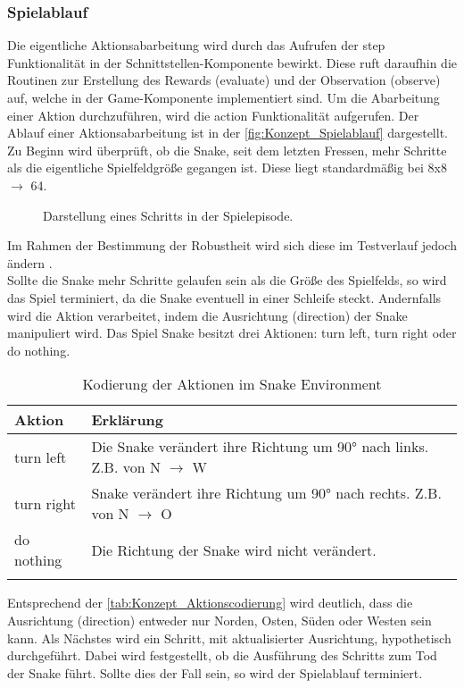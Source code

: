 \subsubsection{Spielablauf} \label{subsubsec:Konzept_Spielablauf}
Die eigentliche Aktionsabarbeitung wird durch das Aufrufen der step Funktionalität in der Schnittstellen-Komponente  bewirkt. Diese ruft daraufhin die Routinen zur Erstellung des Rewards (evaluate) und der Observation (observe) auf, welche in der Game-Komponente implementiert sind.
Um die Abarbeitung einer Aktion durchzuführen, wird die action Funktionalität aufgerufen. Der Ablauf einer Aktionsabarbeitung ist in der \autoref{fig:Konzept_Spielablauf} dargestellt. Zu Beginn wird überprüft, ob die Snake, seit dem letzten Fressen, mehr Schritte als die eigentliche Spielfeldgröße gegangen ist. Diese liegt standardmäßig bei 8x8 $\longrightarrow$ 64.
\begin{figure}[H]
	\centering
	
	\caption[Spielablauf]{Darstellung eines Schritts in der Spielepisode.}
	\label{fig:Konzept_Spielablauf}
\end{figure}
Im Rahmen der Bestimmung der Robustheit wird sich diese im Testverlauf jedoch ändern .\\
Sollte die Snake mehr Schritte gelaufen sein als die Größe des Spielfelds, so wird das Spiel terminiert, da die Snake eventuell in einer Schleife steckt.
Andernfalls wird die Aktion verarbeitet, indem die Ausrichtung (direction) der Snake manipuliert wird. Das Spiel Snake besitzt drei Aktionen: turn left, turn right oder do nothing.
\begin{longtable}[h]{|p{3cm}|p{\linewidth - 4cm}|}
	\hline
	Aktion & Erklärung \\
	\hline
	turn left & Die Snake verändert ihre Richtung um 90° nach links. Z.B. von N $\longrightarrow$ W \\
	\hline
	turn right & Snake verändert ihre Richtung um 90° nach rechts. Z.B. von N $\longrightarrow$ O \\
	\hline
	do nothing & Die Richtung der Snake wird nicht verändert. \\
	\hline
	\caption{Kodierung der Aktionen im Snake Environment}
	\label{tab:Konzept_Aktionscodierung} 
\end{longtable}
Entsprechend der \autoref{tab:Konzept_Aktionscodierung} wird deutlich, dass die Ausrichtung (direction) entweder nur Norden, Osten, Süden oder Westen sein kann.
Als Nächstes wird ein Schritt, mit aktualisierter Ausrichtung, hypothetisch durchgeführt. Dabei wird festgestellt, ob die Ausführung des Schritts zum Tod der Snake führt. Sollte dies der Fall sein, so wird der Spielablauf terminiert.
